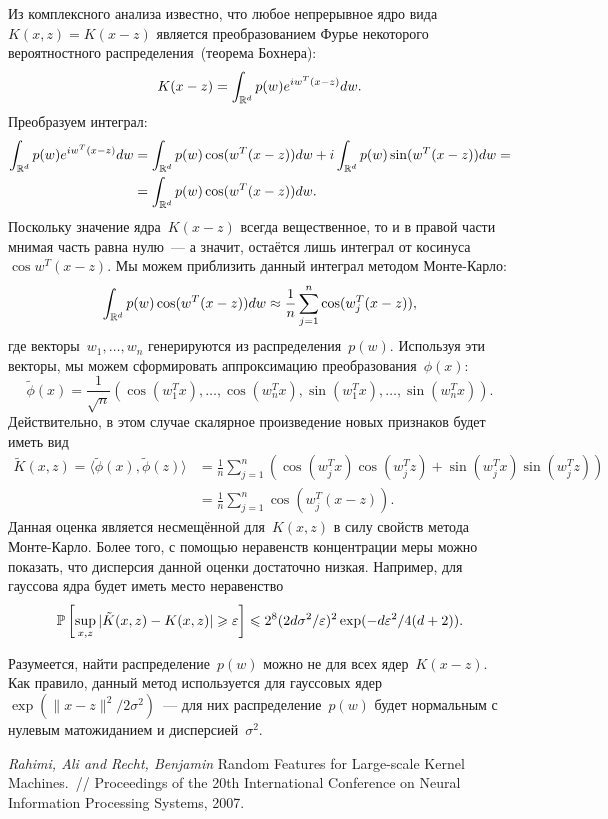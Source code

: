 \documentclass[12pt,fleqn]{article}
\begin{document}
Из комплексного анализа известно, что любое непрерывное ядро вида~$K(x, z) = K(x - z)$
является преобразованием Фурье некоторого вероятностного распределения~(теорема Бохнера):
\[
    K(x - z)
    =
    \int_{\mathbb{R}^d}
        p(w)
        e^{i w^T (x - z)}
    dw.
\]
Преобразуем интеграл:
\begin{align*}
    \int_{\mathbb{R}^d}
        p(w)
        e^{i w^T (x - z)}
    dw
    &=
    \int_{\mathbb{R}^d}
        p(w)
        \cos(w^T (x - z))
    dw
    +
    i
    \int_{\mathbb{R}^d}
        p(w)
        \sin(w^T (x - z))
    dw
    =\\
    &=
    \int_{\mathbb{R}^d}
        p(w)
        \cos(w^T (x - z))
    dw.
\end{align*}
Поскольку значение ядра~$K(x - z)$ всегда вещественное,
то и в правой части мнимая часть равна нулю~---
а значит, остаётся лишь интеграл от косинуса~$\cos w^T (x - z)$.
Мы можем приблизить данный интеграл методом Монте-Карло:
\[
    \int_{\mathbb{R}^d}
        p(w)
        \cos(w^T (x - z))
    dw
    \approx
    \frac{1}{n}
    \sum_{j = 1}^{n}
        \cos(w_j^T (x - z)),
\]
где векторы~$w_1, \dots, w_n$ генерируются из распределения~$p(w)$.
Используя эти векторы, мы можем сформировать аппроксимацию преобразования~$\phi(x)$:
\[
    \tilde \phi(x)
    =
    \frac{1}{\sqrt{n}}
    (\cos(w_1^T x), \dots, \cos(w_n^T x),
    \sin(w_1^T x), \dots, \sin(w_n^T x)).
\]
Действительно, в этом случае скалярное произведение новых признаков будет иметь вид
\begin{align*}
    \tilde K(x, z)
    =
    \langle \tilde \phi(x), \tilde \phi(z) \rangle
    &=
    \frac{1}{n}
    \sum_{j = 1}^{n} \left(
        \cos(w_j^T x) \cos(w_j^T z)
        +
        \sin(w_j^T x) \sin(w_j^T z)
    \right)\\
    &=
    \frac{1}{n}
    \sum_{j = 1}^{n}
        \cos(w_j^T (x - z)).
\end{align*}
Данная оценка является несмещённой для~$K(x, z)$ в силу свойств метода Монте-Карло.
Более того, с помощью неравенств концентрации меры можно показать, что дисперсия данной оценки достаточно низкая.
Например, для гауссова ядра будет иметь место неравенство
\[
    \mathbb{P}
    \left[
        \sup_{x, z}
        | \tilde K(x, z) - K(x, z) |
        \geqslant
        \varepsilon
    \right]
    \leqslant
    2^8
    (2 d \sigma^2 / \varepsilon)^2
    \exp(-d \varepsilon^2 / 4(d + 2)).
\]

Разумеется, найти распределение~$p(w)$ можно не для всех ядер~$K(x - z)$.
Как правило, данный метод используется для гауссовых ядер~$\exp(\|x - z\|^2 / 2 \sigma^2)$~---
для них распределение~$p(w)$ будет нормальным  с нулевым матожиданием и дисперсией~$\sigma^2$.


\begin{thebibliography}{1}
    \emph{Rahimi, Ali and Recht, Benjamin}
    Random Features for Large-scale Kernel Machines.~//
    Proceedings of the 20th International Conference on Neural Information Processing Systems,
    2007.
\end{thebibliography}
\end{document}
